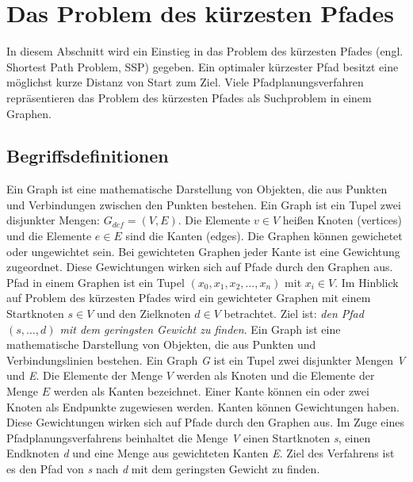 \chapter{Das Problem des kürzesten Pfades}

In diesem Abschnitt wird ein Einstieg in das Problem des kürzesten Pfades (engl. Shortest Path Problem, SSP) gegeben. Ein optimaler kürzester Pfad besitzt eine möglichst kurze Distanz von Start zum Ziel\cite{Madkour.2017}. Viele Pfadplanungsverfahren repräsentieren das Problem des kürzesten Pfades als Suchproblem in einem Graphen.


\section{Begriffsdefinitionen}

Ein Graph ist eine mathematische Darstellung von Objekten, die aus Punkten und Verbindungen zwischen den Punkten bestehen. Ein Graph ist ein Tupel zwei disjunkter Mengen: $G_{def}= (V,E)$. Die Elemente $v \in V$ heißen Knoten (vertices) und die Elemente $e \in E$ sind die Kanten (edges). Die Graphen können gewichetet oder ungewichtet sein. Bei gewichteten Graphen jeder Kante ist eine Gewichtung zugeordnet. Diese Gewichtungen wirken sich auf Pfade durch den Graphen aus\cite{Gross.2004}. Pfad in einem Graphen ist ein Tupel $\left ( x_{0}, x_{1}, x_{2}, ..., x_{n} \right )$ mit $x_{i} \in V$.  Im Hinblick auf Problem des kürzesten Pfades wird ein gewichteter Graphen mit einem Startknoten $s \in V$ und den Zielknoten $d \in V$ betrachtet. Ziel ist: \textit{den Pfad  $\left ( s, ..., d \right )$ mit dem geringsten Gewicht zu finden}\cite{Madkour.2017}. 
Ein Graph ist eine mathematische Darstellung von Objekten, die aus Punkten und Verbindungslinien bestehen. Ein Graph \textit{G} ist ein Tupel zwei disjunkter Mengen \textit{V} und \textit{E}. Die Elemente der Menge $V$ werden als Knoten und die Elemente der Menge $E$ werden als Kanten bezeichnet. Einer Kante können ein oder zwei Knoten als Endpunkte zugewiesen werden. Kanten können Gewichtungen haben. Diese Gewichtungen wirken sich auf Pfade durch den Graphen aus\cite{Gross.2004}. Im Zuge eines Pfadplanungsverfahrens beinhaltet die Menge \textit{V} einen Startknoten \textit{s}, einen Endknoten \textit{d} und eine Menge aus gewichteten Kanten \textit{E}. %
Ziel des Verfahrens ist es den Pfad von \textit{s} nach \textit{d} mit dem geringsten Gewicht zu finden\cite{Madkour.2017}. 

